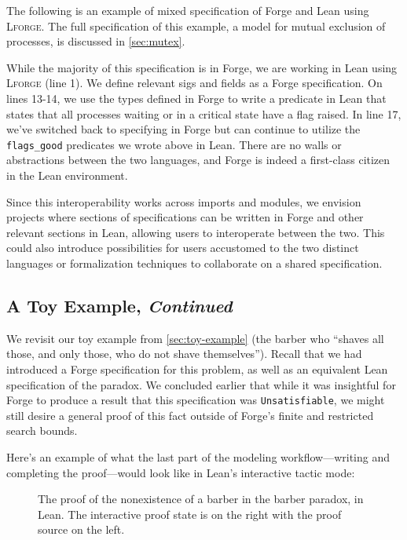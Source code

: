 The following is an example of mixed specification of Forge and Lean using \textsc{Lforge}. The full specification of this example, a model for mutual exclusion of processes, is discussed in \cref{sec:mutex}. 



While the majority of this specification is in Forge, we are working in Lean using \textsc{Lforge} (line 1). We define relevant sigs and fields as a Forge specification. On lines 13-14, we use the types defined in Forge to write a predicate in Lean that states that all processes waiting or in a critical state have a flag raised. In line 17, we've switched back to specifying in Forge but can continue to utilize the \texttt{flags\_good} predicates we wrote above in Lean. There are no walls or abstractions between the two languages, and Forge is indeed a first-class citizen in the Lean environment. 

Since this interoperability works across imports and modules, we envision projects where sections of specifications can be written in Forge and other relevant sections in Lean, allowing users to interoperate between the two. This could also introduce possibilities for users accustomed to the two distinct languages or formalization techniques to collaborate on a shared specification. 

\subsection{A Toy Example, \emph{Continued}}\label{sec:toy-example-continued}

We revisit our toy example from \cref{sec:toy-example} (the barber who ``shaves all those, and only those, who do not shave themselves''). Recall that we had introduced a Forge specification for this problem, as well as an equivalent Lean specification of the paradox. We concluded earlier that while it was insightful for Forge to produce a result that this specification was \texttt{Unsatisfiable}, we might still desire a general proof of this fact outside of Forge's finite and restricted search bounds. 

Here's an example of what the last part of the modeling workflow---writing and completing the proof---would look like in Lean's interactive tactic mode: 

\begin{figure}[h!]
  \centering
  \caption{The proof of the nonexistence of a barber in the barber paradox, in Lean. The interactive proof state is on the right with the proof source on the left. }
  \label{fig:barber-proof}
\end{figure}

